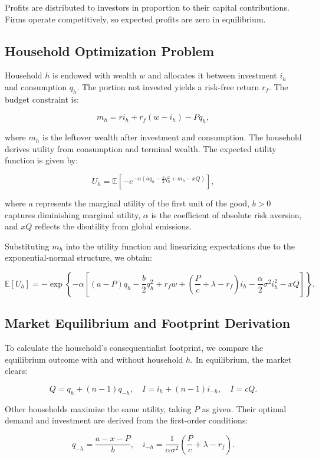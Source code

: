 \documentclass[12pt,a4paper]{article}%
\begin{document}
Profits are distributed to investors in proportion to their capital contributions. Firms operate competitively, so expected profits are zero in equilibrium.

\subsection*{Household Optimization Problem}

Household $h$ is endowed with wealth $w$ and allocates it between investment $i_h$ and consumption $q_h$. The portion not invested yields a risk-free return $r_f$. The budget constraint is:

\[
m_h = r i_h + r_f(w - i_h) - P q_h,
\]

where $m_h$ is the leftover wealth after investment and consumption. The household derives utility from consumption and terminal wealth. The expected utility function is given by:

\[
U_h = \mathbb{E} \left[ -e^{-\alpha \left( a q_h - \frac{b}{2}q_h^2 + m_h - xQ \right)} \right],
\]

where $a$ represents the marginal utility of the first unit of the good, $b > 0$ captures diminishing marginal utility, $\alpha$ is the coefficient of absolute risk aversion, and $xQ$ reflects the disutility from global emissions.

Substituting $m_h$ into the utility function and linearizing expectations due to the exponential-normal structure, we obtain:

\[
\mathbb{E}[U_h] = -\exp \left\{ -\alpha \left[ (a - P)q_h - \frac{b}{2}q_h^2 + r_f w + \left( \frac{P}{c} + \lambda - r_f \right)i_h - \frac{\alpha}{2} \sigma^2 i_h^2 - xQ \right] \right\}.
\]

\subsection*{Market Equilibrium and Footprint Derivation}

To calculate the household's consequentialist footprint, we compare the equilibrium outcome with and without household $h$. In equilibrium, the market clears:

\[
Q = q_h + (n - 1) q_{-h}, \quad I = i_h + (n - 1) i_{-h}, \quad I = cQ.
\]

Other households maximize the same utility, taking $P$ as given. Their optimal demand and investment are derived from the first-order conditions:

\[
q_{-h} = \frac{a - x - P}{b}, \quad i_{-h} = \frac{1}{\alpha \sigma^2} \left( \frac{P}{c} + \lambda - r_f \right).
\]
\end{document}
